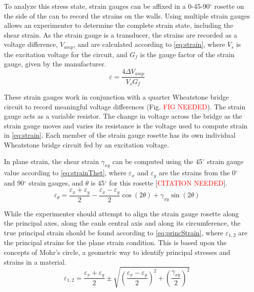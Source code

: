 \documentclass[10pt,journal,letterpaper]{IEEEtran}
\begin{document}
To analyze this stress state, strain gauges can be affixed in a 0-45-90$^\circ$ rosette on the side of the can to record the strains on the walls.
Using multiple strain gauges allows an experimenter to determine the complete strain state, including the shear strain.
As the strain gauge is a transducer, the strains are recorded as a voltage difference, $V_{amp}$, and are calculated according to \eqref{eq:strain},  where $V_s$ is the excitation voltage for the circuit, and $G_f$ is the gauge factor of the strain gauge, given by the manufacturer.
\begin{equation}
\label{eq:strain}
\varepsilon=\frac{4\Delta V_{amp}}{V_s G_f}
\end{equation}

These strain gauges work in conjunction with a quarter Wheatstone bridge circuit to record meaningful voltage differences (Fig. \textcolor{red}{FIG NEEDED}).
The strain gauge acts as a variable resistor.
The change in voltage across the bridge as the strain gauge moves and varies its resistance is the voltage used to compute strain in \eqref{eq:strain}.
Each member of the strain gauge rosette has its own individual Wheatstone bridge circuit fed by an excitation voltage.

In plane strain, the shear strain $\gamma_{xy}$ can be computed using the 45$^\circ$ strain gauge value according to \eqref{eq:strainThet}, where $\varepsilon_x$ and $\varepsilon_y$ are the strains from the 0$^\circ$ and 90$^\circ$ strain gauges, and $\theta$ is 45$^\circ$ for this rosette [\textcolor{red}{CITATION NEEDED}].
\begin{equation}
\label{eq:strainThet}
\varepsilon_\theta=\frac{\varepsilon_x+\varepsilon_y}{2}-\frac{\varepsilon_x-\varepsilon_y}{2}\cos(2\theta)+\gamma_{xy}\sin(2\theta)
\end{equation}

While the experimenter should attempt to align the strain gauge rosette along the principal axes, along the canls central axis and along its circumference, the true principal strain should be found according to \eqref{eq:princStrain}, where $\varepsilon_{1,2}$ are the principal strains for the plane strain condition.
This is based upon the concepts of Mohr’s circle, a geometric way to identify principal stresses and strains in a material.
\begin{equation}
\label{eq:princStrain}
\varepsilon_{1,2}=\frac{\varepsilon_x+\varepsilon_y}{2} \pm \sqrt{\left(\frac{\varepsilon_x-\varepsilon_y}{2}\right)^2+\left(\frac{\gamma_{xy}}{2}\right)^2}
\end{equation}
\end{document}
